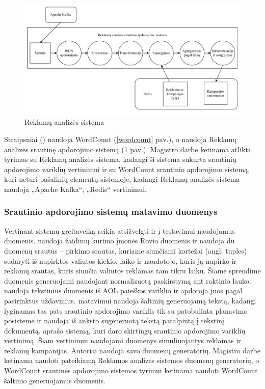 \documentclass{VUMIFPSbakalaurinis}
\begin{document}
\begin{figure}[H]
    \includegraphics[width=15cm]{img/yahoo.pdf}
    \caption{Reklamų analizės sistema \cite{Chintapalli2016Benchmarking}}
    \label{yahoo}
\end{figure} 

Straipsniai (\cite{Qian2016Benchmarking, huang2010hibench, dhalion}) naudoja WordCount (\ref{wordcount} pav.), o \cite{Chintapalli2016Benchmarking, vaquero2018autotuning} naudoja Reklamų analizės srautinę apdorojimo sistemą (\ref{yahoo} pav.). Magistro darbe ketinama atlikti tyrimus su Reklamų analizės sistema, kadangi ši sistema sukurta srautinių apdorojimo variklių vertinimui ir su WordCount srautinio apdorojimo sistemą, kuri neturi pašalinių elementų sistemoje, kadangi Reklamų analizės sistema naudoja „Apache Kafka“, „Redis“ vertinimui.    

\subsubsection{Srautinio apdorojimo sistemų matavimo duomenys}

Vertinant sistemų greitaveiką reikia atsižvelgti ir į testavimui naudojamus duomenis. \cite{Karimov2018BenchmarkingDS} naudoja žaidimų kūrimo įmonės Rovio duomenis ir naudoja du duomenų srautus – pirkimo srautas, kuriame siunčiami kortežai (angl. tuples) sudaryti iš nupirktos valiutos kiekio, laiko ir naudotojo, kuris ją nupirko ir reklamų srautas, kuris siunčia valiutos reklamas tam tikru laiku. Šiame sprendime duomenis generuojami naudojant normalizuotą paskirstymą ant raktinio lauko. \cite{Qian2016Benchmarking} naudoja tekstinius duomenis iš AOL paieškos variklio ir apdoroja juos pagal pasirinktus uždavinius. \cite{zhang2020heron} matavimui naudoja šaltinių generuojamą tekstą, kadangi lyginamas tas pats srautinio apdorojimo variklis tik su patobulinta planavimo posisteme ir naudoja iš anksto sugeneruotą tekstą patalpintą į tekstinį dokumentą. \cite{Chintapalli2016Benchmarking} aprašo sistemą, kuri daro skirtingų srautinio apdorojimo variklių vertinimą. Šiam vertinimui naudojami duomenys simuliuojantys reklamas ir reklamų kampanijas. Autoriai naudoja savo duomenų generatorių. 
Magistro darbe ketinama naudoti \cite{Chintapalli2016Benchmarking} pateikiamą Reklamos analizės sistemos duomenų generatorių, o WordCount srautinės apdorojimo sistemos tyrimui ketinama naudoti WordCount šaltinio generuojamus duomenis.
\end{document}
